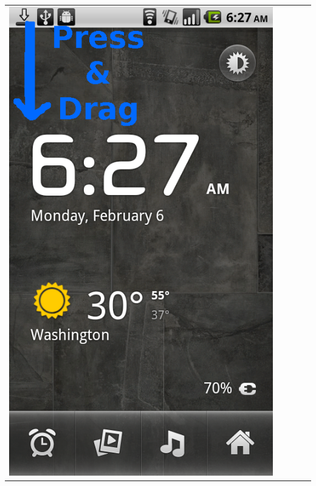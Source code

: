 \documentclass[a4paper,10pt]{article}
\begin{document}
\begin{flushleft}
\begin{tabular}{ c c c c c }
\includegraphics[scale=0.15,keepaspectratio=true]{client_download_notification.png}

\end{tabular}
\end{flushleft}
\end{document}

